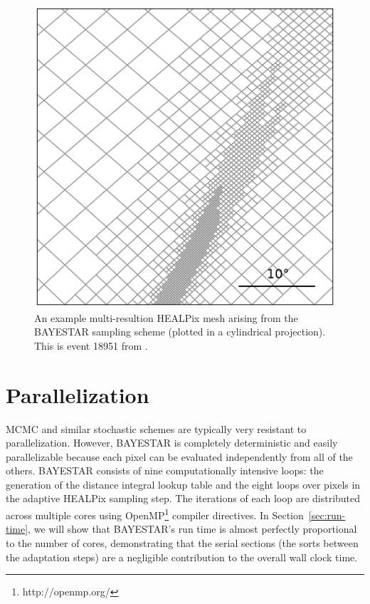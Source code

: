 \documentclass[amsmath,amssymb,aps,prx,reprint,nopreprintnumbers,nofootinbib,showpacs]{revtex4-1}
\begin{document}
\begin{figure}
    \includegraphics[width=\columnwidth]{adaptive_mesh}
    \caption{\label{fig:adaptive-mesh}An example multi\nobreakdashes-resultion \ac{HEALPix} mesh arising from the \ac{BAYESTAR} sampling scheme (plotted in a cylindrical projection). This is event 18951 from \cite{FirstTwoYears}.}
\end{figure}

\section{Parallelization}

\ac{MCMC} and similar stochastic schemes are typically very resistant to parallelization. However, \ac{BAYESTAR} is completely deterministic and easily parallelizable because each pixel can be evaluated independently from all of the others. \ac{BAYESTAR} consists of nine computationally intensive loops: the generation of the distance integral lookup table and the eight loops over pixels in the adaptive HEALPix sampling step. The iterations of each loop are distributed across multiple cores using OpenMP\footnote{http://openmp.org/} compiler directives. In Section~\ref{sec:run-time}, we will show that \ac{BAYESTAR}'s run time is almost perfectly proportional to the number of cores, demonstrating that the serial sections (the sorts between the adaptation steps) are a negligible contribution to the overall wall clock time.
\end{document}
